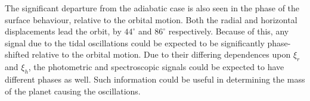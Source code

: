 \documentclass[a0,portrait]{a0poster}
\begin{document}
\begin{multicols}{2}
\begin{tcolorbox}[colframe=black,colback=blue!10!white]
The significant departure from the adiabatic case is also seen in the phase of the surface behaviour, relative to the orbital motion. Both the radial and horizontal displacements lead the orbit, by $44^{\circ}$ and $86^{\circ}$ respectively. Because of this, any signal due to the tidal oscillations could be expected to be significantly phase-shifted relative to the orbital motion. Due to their differing dependences upon $\xi_{r}$ and $\xi_{h}$, the photometric and spectroscopic signals could be expected to have different phases as well. Such information could be useful in determining the mass of the planet causing the oscillations.



\end{tcolorbox}
\end{multicols}
\end{document}
